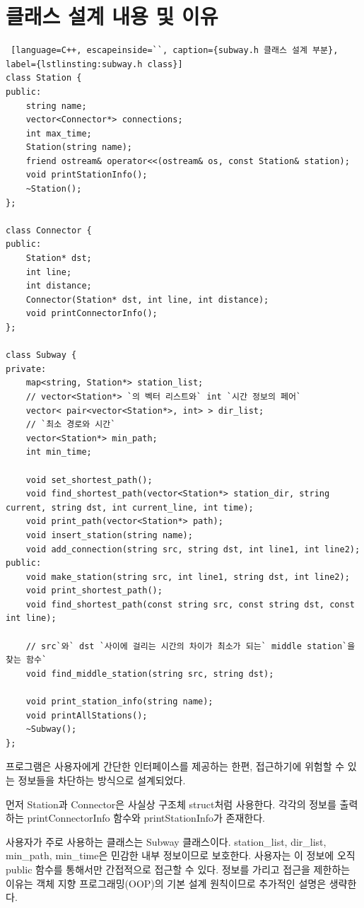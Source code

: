 \documentclass{article}
\begin{document}
\section{클래스 설계 내용 및 이유}
\begin{lstlisting} [language=C++, escapeinside=``, caption={subway.h 클래스 설계 부분}, label={lstlinsting:subway.h class}]
class Station {
public:
	string name;
	vector<Connector*> connections;
	int max_time;
	Station(string name);
	friend ostream& operator<<(ostream& os, const Station& station);
	void printStationInfo();
	~Station();
};

class Connector {
public:
	Station* dst;
	int line;
	int distance;
	Connector(Station* dst, int line, int distance);
	void printConnectorInfo();
};

class Subway {
private:
	map<string, Station*> station_list;
	// vector<Station*> `의 벡터 리스트와` int `시간 정보의 페어`
	vector< pair<vector<Station*>, int> > dir_list;
	// `최소 경로와 시간`
	vector<Station*> min_path;
	int min_time;

	void set_shortest_path();
	void find_shortest_path(vector<Station*> station_dir, string current, string dst, int current_line, int time);
	void print_path(vector<Station*> path);
	void insert_station(string name);
	void add_connection(string src, string dst, int line1, int line2);
public:
	void make_station(string src, int line1, string dst, int line2);
	void print_shortest_path();
	void find_shortest_path(const string src, const string dst, const int line);

	// src`와` dst `사이에 걸리는 시간의 차이가 최소가 되는` middle station`을 찾는 함수`
	void find_middle_station(string src, string dst);

	void print_station_info(string name);
	void printAllStations();
	~Subway();
};
\end{lstlisting}

프로그램은 사용자에게 간단한 인터페이스를 제공하는 한편, 접근하기에 위험할 수 있는 정보들을 차단하는 방식으로 설계되었다.

먼저 Station과 Connector은 사실상 구조체 struct처럼 사용한다. 각각의 정보를 출력하는 printConnectorInfo 함수와 printStationInfo가 존재한다.

사용자가 주로 사용하는 클래스는 Subway 클래스이다. station\_list, dir\_list, min\_path, min\_time은 민감한 내부 정보이므로 보호한다. 사용자는 이 정보에 오직 public 함수를 통해서만 간접적으로 접근할 수 있다. 정보를 가리고 접근을 제한하는 이유는 객체 지향 프로그래밍(OOP)의 기본 설계 원칙이므로 추가적인 설명은 생략한다.
\end{document}
